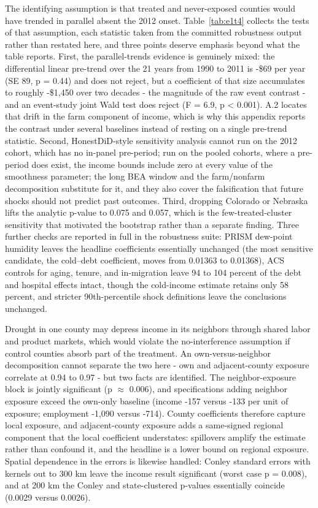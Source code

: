\documentclass[a4paper,11pt]{article}
\begin{document}
The identifying assumption is that treated and never-exposed counties would have trended in parallel absent the 2012 onset. Table~\ref{tab:e1t4} collects the tests of that assumption, each statistic taken from the committed robustness output rather than restated here, and three points deserve emphasis beyond what the table reports. First, the parallel-trends evidence is genuinely mixed: the differential linear pre-trend over the 21 years from 1990 to 2011 is -\$69 per year (SE 89, p = 0.44) and does not reject, but a coefficient of that size accumulates to roughly -\$1,450 over two decades - the magnitude of the raw event contrast - and an event-study joint Wald test does reject (F = 6.9, p < 0.001). A.2 locates that drift in the farm component of income, which is why this appendix reports the contrast under several baselines instead of resting on a single pre-trend statistic. Second, HonestDiD-style sensitivity analysis \citep{rambachan2023honestdid} cannot run on the 2012 cohort, which has no in-panel pre-period; run on the pooled cohorts, where a pre-period does exist, the income bounds include zero at every value of the smoothness parameter; the long BEA window and the farm/nonfarm decomposition substitute for it, and they also cover the falsification that future shocks should not predict past outcomes. Third, dropping Colorado or Nebraska lifts the analytic p-value to 0.075 and 0.057, which is the few-treated-cluster sensitivity that motivated the bootstrap rather than a separate finding. Three further checks are reported in full in the robustness suite: PRISM dew-point humidity leaves the headline coefficients essentially unchanged (the most sensitive candidate, the cold--debt coefficient, moves from 0.01363 to 0.01368), ACS controls for aging, tenure, and in-migration leave 94 to 104 percent of the debt and hospital effects intact, though the cold-income estimate retains only 58 percent, and stricter 90th-percentile shock definitions leave the conclusions unchanged.



Drought in one county may depress income in its neighbors through shared labor and product markets, which would violate the no-interference assumption if control counties absorb part of the treatment. An own-versus-neighbor decomposition cannot separate the two here - own and adjacent-county exposure correlate at 0.94 to 0.97 - but two facts are identified. The neighbor-exposure block is jointly significant (p $\approx$ 0.006), and specifications adding neighbor exposure exceed the own-only baseline (income -157 versus -133 per unit of exposure; employment -1,090 versus -714). County coefficients therefore capture local exposure, and adjacent-county exposure adds a same-signed regional component that the local coefficient understates: spillovers amplify the estimate rather than confound it, and the headline is a lower bound on regional exposure. Spatial dependence in the errors is likewise handled: Conley standard errors with kernels out to 300 km leave the income result significant (worst case p = 0.008), and at 200 km the Conley and state-clustered p-values essentially coincide (0.0029 versus 0.0026).
\end{document}
